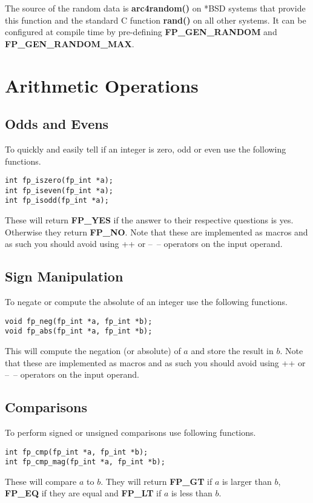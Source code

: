 \documentclass[b5paper]{book}
\begin{document}
 
The source of the random data is \textbf{arc4random()} on *BSD systems that provide this function
and the standard C function \textbf{rand()} on all other systems. It can be configured at compile time
by pre-defining \textbf{FP\_GEN\_RANDOM} and \textbf{FP\_GEN\_RANDOM\_MAX}.

\chapter{Arithmetic Operations}
\section{Odds and Evens}
To quickly and easily tell if an integer is zero, odd or even use the following functions.

  
\begin{verbatim}
int fp_iszero(fp_int *a);
int fp_iseven(fp_int *a);
int fp_isodd(fp_int *a);
\end{verbatim}

These will return \textbf{FP\_YES} if the answer to their respective questions is yes.  Otherwise they
return \textbf{FP\_NO}.  Note that these are implemented as macros and as such you should avoid using 
++ or --~-- operators on the input operand.

\section{Sign Manipulation}
To negate or compute the absolute of an integer use the following functions.

 
\begin{verbatim}
void fp_neg(fp_int *a, fp_int *b);
void fp_abs(fp_int *a, fp_int *b);
\end{verbatim}
This will compute the negation (or absolute) of $a$ and store the result in $b$.  Note that these 
are implemented as macros and as such you should avoid using ++ or --~-- operators on the input 
operand.

\section{Comparisons}
To perform signed or unsigned comparisons use following functions.

 
\begin{verbatim}
int fp_cmp(fp_int *a, fp_int *b);
int fp_cmp_mag(fp_int *a, fp_int *b);
\end{verbatim}
These will compare $a$ to $b$.  They will return \textbf{FP\_GT} if $a$ is larger than $b$, 
\textbf{FP\_EQ} if they are equal and \textbf{FP\_LT} if $a$ is less than $b$.
\end{document}
